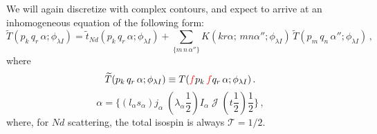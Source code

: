 \documentclass[11pt,aps]{revtex4}
\newcommand{\PF}{{\color{red}f}}
\begin{document}
We will again discretize with complex contours, and expect to arrive at an inhomogeneous equation of the following form:
\begin{equation}
  \widetilde{T}(p_k\, q_r\, \alpha; \phi_{\lambda I}) = \widetilde{t}_{Nd}(p_k\, q_r\, \alpha; \phi_{\lambda I}) + \sum_{\{m\, n\, \alpha''\}}  K\left(kr\alpha;\, mn\alpha''; \phi_{\lambda I} \right)\, \widetilde{T}(p_m\, q_n\, \alpha''; \phi_{\lambda I}) \, ,
\end{equation}
where
\begin{equation}
  \widetilde{T}(p_k\, q_r\, \alpha; \phi_{\lambda I}) \equiv T(\PF p_k\, \PF q_r\, \alpha; \phi_{\lambda I}) \, .
\end{equation}
\begin{equation}
  \alpha = \{ (l_\alpha s_\alpha) j_\alpha\; (\lambda_\alpha \frac{1}{2}) I_\alpha\; \mathcal{J}\; (t \frac{1}{2}) \frac{1}{2}\} \, , \label{eqn-alpha}
\end{equation}
where, for $N d$ scattering, the total isospin is always $\mathcal{T} = 1/2$.
\end{document}
